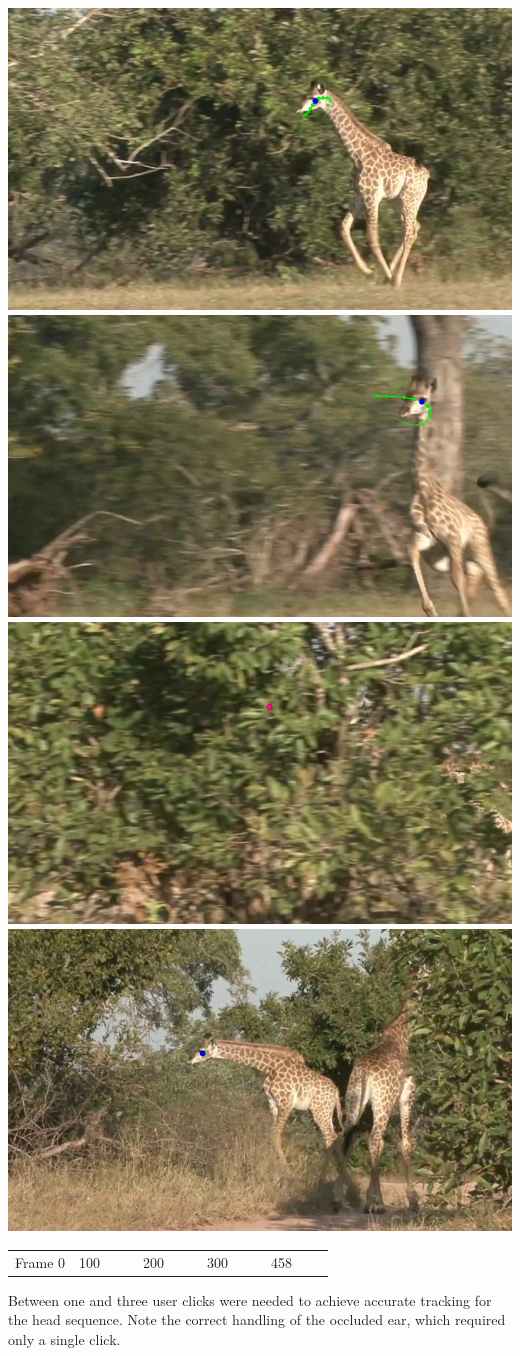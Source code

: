 \documentclass[landscape,final,fontscale=0.225,paperwidth=67.5in,paperheight=45in]{baposter}
\begin{document}
\begin{poster}
{{          \includegraphics[width=0.2\linewidth]{giraffe-run-100-rastered}%
          \includegraphics[width=0.2\linewidth]{giraffe-run-200-rastered}%
          \includegraphics[width=0.2\linewidth]{giraffe-run-300-rastered}%
          \includegraphics[width=0.2\linewidth]{giraffe-run-458-rastered}%
      }
  \begin{tabular*}{\linewidth}{*{5}{@{}p{0.2\linewidth}@{}}}
    {\hfill{}Frame 0\hfill{}}  &
    {\hfill{}100\hfill{}} &
    {\hfill{}200\hfill{}} &
    {\hfill{}300\hfill{}} &
    {\hfill{}458\hfill{}} 
  \end{tabular*}
      \begin{multicols}{2}
    Between one and three user clicks were needed to achieve accurate tracking for
      the head sequence. Note the correct handling of the occluded ear, which
      required only a single click. 


\end{multicols}}
\end{poster}
\end{document}
